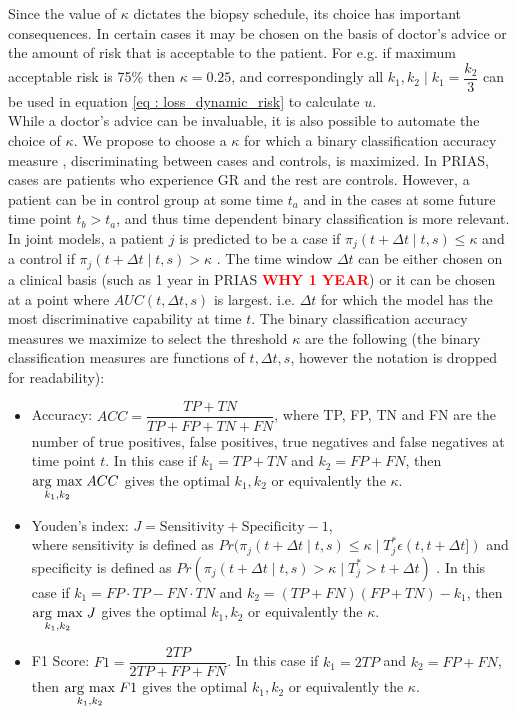 Since the value of $\kappa$ dictates the biopsy schedule, its choice has important consequences. In certain cases it may be chosen on the basis of doctor's advice or the amount of risk that is acceptable to the patient. For e.g. if maximum acceptable risk is 75\% then $\kappa = 0.25$, and correspondingly all $k_1, k_2 \mid k_1=\dfrac{k_2}{3}$ can be used in equation \ref{eq : loss_dynamic_risk} to calculate $u$. \\

While a doctor's advice can be invaluable, it is also possible to automate the choice of $\kappa$. We propose to choose a $\kappa$ for which a binary classification accuracy measure \citep{lopez2014optimalcutpoints,sokolova2009systematic}, discriminating between cases and controls, is maximized. In PRIAS, cases are patients who experience GR and the rest are controls. However, a patient can be in control group at some time $t_a$ and in the cases at some future time point $t_b > t_a$, and thus time dependent binary classification is more relevant. In joint models, a patient $j$ is predicted to be a case if $\pi_j(t + \Delta t \mid t,s) \leq \kappa$ and a control if $\pi_j(t + \Delta t \mid t,s) > \kappa$ \citep{rizopoulosJMbayes}. The time window $\Delta t$ can be either chosen on a clinical basis (such as 1 year in PRIAS \textcolor{red}{\textbf{WHY 1 YEAR}}) or it can be chosen at a point where $AUC(t, \Delta t, s)$ \citep{rizopoulosJMbayes} is largest. i.e. $\Delta t$ for which the model has the most discriminative capability at time $t$. The binary classification accuracy measures we maximize to select the threshold $\kappa$ are the following (the binary classification measures are functions of $t, \Delta t, s$, however the notation is dropped for readability): 

\begin{itemize}
\item Accuracy: $ACC = \dfrac{TP + TN}{TP + FP + TN + FN}$, where TP, FP, TN and FN are the number of true positives, false positives, true negatives and false negatives at time point $t$. In this case if $k_1 = TP + TN$ and $k_2 = FP + FN$, then $\underset{k_1, k_2}{\operatorname{arg}\,\operatorname{max}}\; ACC$ gives the optimal $k_1, k_2$ or equivalently the $\kappa$.

\item Youden's index: $J = \text{Sensitivity} + \text{Specificity}- 1$,\\
where sensitivity is defined as $Pr(\pi_j(t + \Delta t \mid t,s) \leq \kappa \mid T^*_j \epsilon (t, t + \Delta t])$ and specificity is defined as $Pr(\pi_j(t + \Delta t \mid t,s) > \kappa \mid T^*_j > t + \Delta t)$ \citep{rizopoulosJMbayes}. In this case if $k_1 = FP \cdot TP - FN \cdot TN$ and $k_2 = (TP+FN)(FP+TN) - k_1$, then $\underset{k_1, k_2}{\operatorname{arg}\,\operatorname{max}}\; J$ gives the optimal $k_1, k_2$ or equivalently the $\kappa$.

\item F1 Score: $F1 = \dfrac{2TP}{2TP + FP + FN}$. In this case if $k_1 = 2TP$ and $k_2 = FP + FN$, then $\underset{k_1, k_2}{\operatorname{arg}\,\operatorname{max}}\; F1$ gives the optimal $k_1, k_2$ or equivalently the $\kappa$.
\end{itemize}

